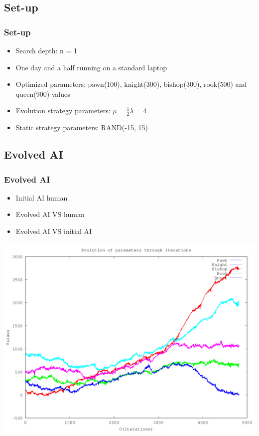 \documentclass{beamer}
\begin{document}
\begin{frame}
\subsection{Set-up}
\frametitle{Set-up}
\begin{itemize}
\item Search depth: n = 1
\item One day and a half running on a standard laptop
\item Optimized parameters: pawn(100), knight(300), bishop(300), rook(500) and queen(900) values
\item Evolution strategy parameters: $\mu = \frac{1}{2} \lambda = 4$
\item Static strategy parameters: RAND(-15, 15)
\end{itemize}
\end{frame}

\begin{frame}
\subsection{Evolved AI}
\frametitle{Evolved AI}
\begin{itemize}
\item Initial AI human
\item Evolved AI VS human
\item Evolved AI VS initial AI
\end{itemize}
\end{frame}

\begin{frame}
\begin{center}
\includegraphics[scale=0.5]{../results/history_individuals_1.png}
\end{center}
\end{frame}
\end{document}
